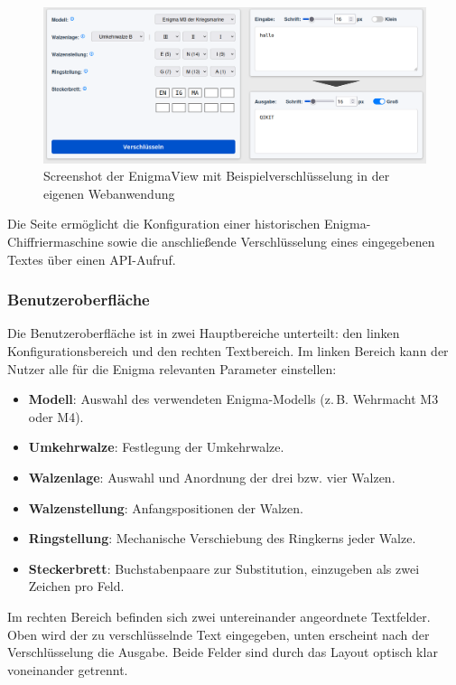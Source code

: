 \documentclass[12pt, ngerman, a4paper, numbers=noenddot]{article}
\begin{document}
\begin{figure}[H]
	\centering
	\includegraphics[width=1\textwidth]{bilder/EnigmaView.png}
	\caption{Screenshot der EnigmaView mit Beispielverschlüsselung in der eigenen Webanwendung}
	\label{fig:EnigmaView}
\end{figure}

Die Seite ermöglicht die Konfiguration einer historischen Enigma-Chiffrier\-maschine sowie die anschließende Verschlüsselung eines eingegebenen Textes über einen API-Aufruf.

\subsubsection{Benutzeroberfläche}

Die Benutzeroberfläche ist in zwei Hauptbereiche unterteilt: den linken Konfigurationsbereich und den rechten Textbereich. Im linken Bereich kann der Nutzer alle für die Enigma relevanten Parameter einstellen:

\begin{itemize}
	\item \textbf{Modell}: Auswahl des verwendeten Enigma-Modells (z.\,B. Wehrmacht M3 oder M4).
	\item \textbf{Umkehrwalze}: Festlegung der Umkehrwalze.
	\item \textbf{Walzenlage}: Auswahl und Anordnung der drei bzw. vier Walzen.
	\item \textbf{Walzenstellung}: Anfangspositionen der Walzen.
	\item \textbf{Ringstellung}: Mechanische Verschiebung des Ringkerns jeder Walze.
	\item \textbf{Steckerbrett}: Buchstabenpaare zur Substitution, einzugeben als zwei Zeichen pro Feld.
\end{itemize}

Im rechten Bereich befinden sich zwei untereinander angeordnete Textfelder. Oben wird der zu verschlüsselnde Text eingegeben, unten erscheint nach der Verschlüsselung die Ausgabe. Beide Felder sind durch das Layout optisch klar voneinander getrennt.
\end{document}
